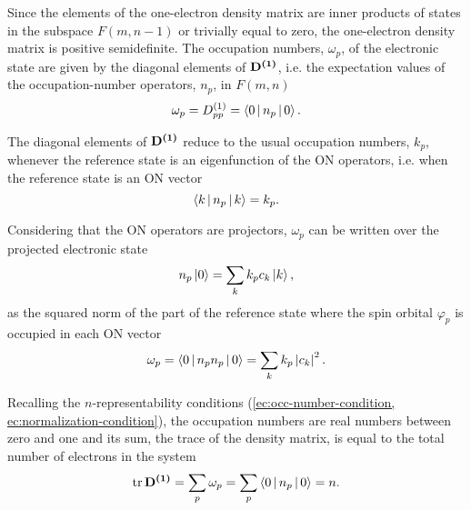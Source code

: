 Since the elements of the one-electron density matrix are inner products of 
states in the subspace $F\left( m, n-1 \right)$ or trivially equal to zero, 
the one-electron density matrix is positive semidefinite.
The occupation numbers, $\omega_p$, of the electronic state are given by the
diagonal elements of $ \mat{\oedm}$, i.e. the expectation values of the 
occupation-number operators, $n_p$, in $F\left( m,n \right)$
\begin{equation}
    \omega_p = \oedm_{pp} = \Braket{0 | n_p | 0}
    .
\end{equation}

The diagonal elements of $ \mat{\oedm}$ reduce to the usual occupation numbers,
$k_p$, whenever the reference state is an eigenfunction of the ON operators, i.e.
when the reference state is an ON vector 
\begin{equation}
    \Braket{k | n_p | k} = k_p
    .
\end{equation}

Considering that the ON operators are projectors, $\omega_p$ can be written 
over the projected electronic state 
\begin{equation}
    n_p \Ket{0} = \sum_{k} k_p c_k \Ket{k}
    ,
\end{equation}
as 
the squared norm of the part of the reference state where the spin orbital
$\varphi_p$ is occupied in each ON vector
\begin{equation}
    \omega_p =
    \Braket{0 | n_p n_p | 0} =
    \sum_{k} k_p \left| c_k \right|^2
    .
\end{equation}

Recalling the $n$-representability conditions 
(\cref{ec:occ-number-condition, ec:normalization-condition}),
the occupation numbers are real numbers between zero and one 
and its sum, the trace of the density matrix, is equal to the total number
of electrons in the system 
\begin{equation}
    \trace \mat{\oedm} =
    \sum_{p} \omega_p =
    \sum_{p} \Braket{0 | n_p | 0} =
    n
    .
\end{equation}

